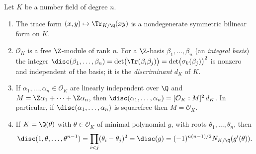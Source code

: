 \begin{theorem}\label{thm:ant:integralbasis}
Let $K$ be a number field of degree $n$.
\begin{enumerate}[label=(\roman*)]
\item The trace form $(x,y)\mapsto\Tr_{K/\Q}(xy)$ is a nondegenerate symmetric bilinear form on $K$.
\item $\mathcal O_K$ is a free $\Z$-module of rank $n$. For a $\Z$-basis $\beta_1,\dots,\beta_n$ (an \emph{integral basis}) the integer
$\disc(\beta_1,\dots,\beta_n)=\det\bigl(\Tr(\beta_i\beta_j)\bigr)=\det\bigl(\sigma_k(\beta_j)\bigr)^2$ is nonzero and independent of the basis; it is
the \emph{discriminant} $d_K$ of $K$.
\item If $\alpha_1,\dots,\alpha_n\in\mathcal O_K$ are linearly independent over $\Q$ and $M=\Z\alpha_1+\dots+\Z\alpha_n$, then
$\disc(\alpha_1,\dots,\alpha_n)=[\mathcal O_K:M]^2\,d_K$. In particular, if $\disc(\alpha_1,\dots,\alpha_n)$ is squarefree then $M=\mathcal O_K$.
\item If $K=\Q(\theta)$ with $\theta\in\mathcal O_K$ of minimal polynomial $g$, with roots $\theta_1,\dots,\theta_n$, then
\[
\disc(1,\theta,\dots,\theta^{n-1})=\prod_{i<j}(\theta_i-\theta_j)^2=\disc(g)=(-1)^{n(n-1)/2}N_{K/\Q}(g'(\theta)).
\]
\end{enumerate}
\end{theorem}

